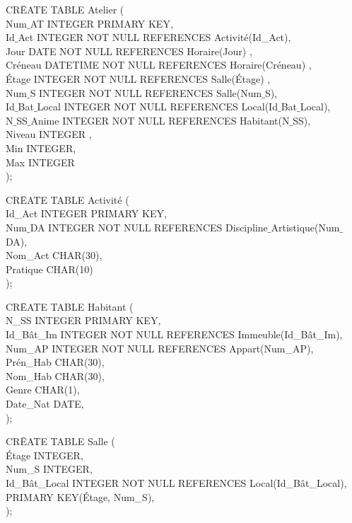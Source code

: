 \documentclass[a4paper,10.5pt]{report}
\begin{document}
		\begin{tabbing}
			CR\=EATE TABLE Atelier (\\
			\> Num$\_$AT INTEGER PRIMARY KEY,\\
			\> Id$\_$Act INTEGER NOT NULL REFERENCES Activité(Id\_Act),\\
            \> Jour DATE NOT NULL REFERENCES Horaire(Jour) ,\\
            \> Créneau DATETIME NOT NULL REFERENCES Horaire(Créneau) ,\\
            \> Étage INTEGER NOT NULL REFERENCES Salle(Étage) ,\\
			\> Num$\_$S INTEGER NOT NULL REFERENCES Salle(Num$\_$S),\\
			\> Id$\_$Bat$\_$Local INTEGER NOT NULL REFERENCES Local(Id$\_$Bat$\_$Local),\\
			\> N$\_$SS$\_$Anime  INTEGER NOT NULL REFERENCES Habitant(N$\_$SS),\\
			\> Niveau INTEGER ,\\
			\> Min INTEGER,\\
			\> Max INTEGER\\);
		\end{tabbing}

		\begin{tabbing}
			CR\=EATE TABLE Activité (\\
			\> Id\_Act INTEGER PRIMARY KEY,\\
			\> Num$\_$DA INTEGER NOT NULL REFERENCES Discipline$\_$Artistique(Num$\_$DA),\\
			\> Nom\_Act CHAR(30),\\
			\> Pratique CHAR(10)\\);
		\end{tabbing}

		\begin{tabbing}
			CR\=EATE TABLE Habitant (\\
			\> N\_SS INTEGER PRIMARY KEY,\\
			\> Id\_Bât\_Im INTEGER NOT NULL REFERENCES Immeuble(Id\_Bât\_Im),\\
			\> Num\_AP INTEGER NOT NULL REFERENCES Appart(Num\_AP),\\
			\> Prén\_Hab CHAR(30),\\
			\> Nom\_Hab CHAR(30),\\
			\> Genre CHAR(1),\\
			\> Date\_Nat DATE,\\);
		\end{tabbing}

		\begin{tabbing}
			CR\=EATE TABLE Salle (\\
			\> Étage INTEGER,\\
			\> Num\_S INTEGER,\\
			\> Id\_Bât\_Local INTEGER NOT NULL REFERENCES Local(Id\_Bât\_Local),\\
			\> PRIMARY KEY(Étage, Num\_S),\\);
		\end{tabbing}
\end{document}
